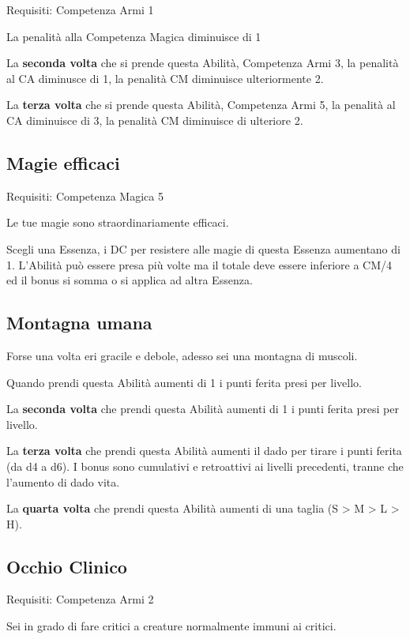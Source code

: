 \documentclass[a4paper,11pt,twoside,openany]{book}
\begin{document}
Requisiti: Competenza Armi 1

La penalità alla Competenza Magica diminuisce di 1

La \textbf{seconda volta} che si prende questa Abilità, Competenza Armi 3, la penalità al CA diminusce di 1, la penalità CM diminuisce ulteriormente 2.

La \textbf{terza volta} che si prende questa Abilità, Competenza Armi 5, la penalità al CA diminuisce di 3, la penalità CM diminuisce di ulteriore 2.

\subsection{Magie efficaci}

Requisiti: Competenza Magica 5

Le tue magie sono straordinariamente efficaci.

Scegli una Essenza, i DC per resistere alle magie di questa Essenza aumentano di 1. L'Abilità può essere presa più volte ma il totale deve essere inferiore a CM/4 ed il bonus si somma o si applica ad altra Essenza.

\subsection{Montagna umana}

Forse una volta eri gracile e debole, adesso sei una montagna di muscoli.

Quando prendi questa Abilità aumenti di 1 i punti ferita presi per livello.

La \textbf{seconda volta} che prendi questa Abilità aumenti di 1 i punti ferita presi per livello.

La \textbf{terza volta} che prendi questa Abilità aumenti il dado per tirare i punti ferita (da d4 a d6).
I bonus sono cumulativi e retroattivi ai livelli precedenti, tranne che l’aumento di dado vita.

La \textbf{quarta volta} che prendi questa Abilità aumenti di una taglia (S > M > L > H).

\subsection{Occhio Clinico}

Requisiti: Competenza Armi 2

Sei in grado di fare critici a creature normalmente immuni ai critici.
\end{document}
